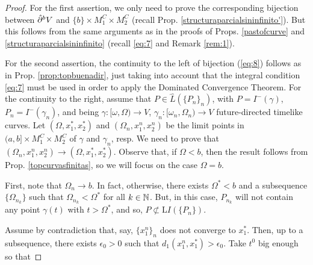 \begin{proof}
For the first assertion, we only need to prove the corresponding bijection between $\hat{\partial}^{{\color{black} b}} V$ and $\{b\}\times M_1^C\times M_2^C$ (recall Prop. \ref{structuraparcialsininfinito'}). But this follows from the same arguments as in the proofs of Props. \ref{pastofcurve} and \ref{structuraparcialsininfinito} (recall \eqref{eq:7} and Remark \ref{rem:1}).
%
%
%
%

For the second assertion, the continuity to the left of bijection (\ref{eq:8}) follows as in Prop. \ref{prop:topbuenadir}, just taking into account that the integral condition \eqref{eq:7} must be used in order to apply the Dominated Convergence Theorem. For the continuity to the right, assume that $P\in \hat{L}(\{P_n\}_n)$, with $P=I^-(\gamma)$, $P_n=I^-(\gamma_n)$, and being $\gamma:[\omega,\Omega)\rightarrow V$, $\gamma_n:[\omega_n,\Omega_n)\rightarrow V$ future-directed timelike curves. Let $(\Omega,x_1^*,x_2^*)$ and $(\Omega_n,x_1^n,x_2^n)$ be the limit points in $(a,b]\times M_1^C\times M_2^C$ of $\gamma$ and $\gamma_n$, resp. We need to prove that $(\Omega_n,x_1^n,x_2^n)\rightarrow (\Omega,x_1^*,x_2^*)$. Observe that, if $\Omega<b$, then the result follows from Prop. \ref{topcurvasfinitas}, so we will focus on the case $\Omega=b$.

First, note that $\Omega_n\rightarrow b$. In fact, otherwise, there exists $\Omega^*<b$ and a subsequence $\{\Omega_{n_k}\}$ such that $\Omega_{n_k}<\Omega^*$ for all $k\in {\mathbb N}$. But, in this case, $P_{n_k}$ will not contain any point $\gamma(t)$ with $t>\Omega^*$, and so, $P\not\subset  {\mathrm LI}(\{P_n\})$.

Assume by contradiction that, say, $\{x_1^n\}_n$ does not converge to $ x_1^*$. Then, up to a subsequence, there exists $\epsilon_0>0$ such that $d_1(x_1^n,x_1^*)>\epsilon_0$. Take $t^0$ big enough so that


\end{proof}
